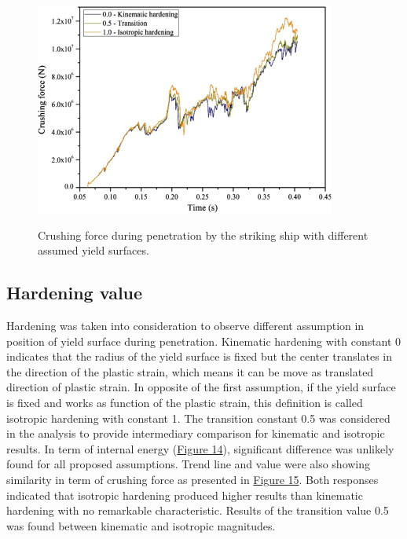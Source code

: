 \documentclass[../Final.tex]{subfiles}
\begin{document}
\begin{figure}[ht]
    \centering
    \includegraphics[width=\columnwidth]{fig15.jpg}
    \label{fig15}
    \caption{Crushing force during penetration by the striking ship with different assumed yield surfaces.}
\end{figure}

\subsection{Hardening value}

Hardening was taken into consideration to observe different assumption in position of yield surface during penetration. 
Kinematic hardening with constant 0 indicates that the radius of the yield surface is fixed but the center translates in the direction of the plastic strain, which means it can be move as translated direction of plastic strain. 
In opposite of the first assumption, if the yield surface is fixed and works as function of the plastic strain, this definition is called isotropic hardening with constant 1. 
The transition constant 0.5 was considered in the analysis to provide intermediary comparison for kinematic and isotropic results. 
In term of internal energy (\hyperref[fig14]{Figure 14}), significant difference was unlikely found for all proposed assumptions. Trend line and value were also showing similarity in term of crushing force as presented in \hyperref[fig15]{Figure 15}. 
Both responses indicated that isotropic hardening produced higher results than kinematic hardening with no remarkable characteristic. Results of the transition value 0.5 was found between kinematic and isotropic magnitudes. 
\end{document}
